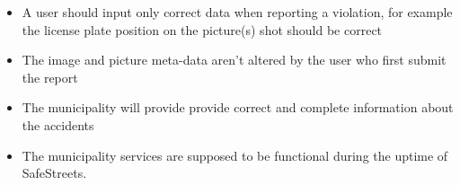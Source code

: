 \begin{itemize}

\item A user should input only correct data when reporting a violation, for example the license plate position on the picture(s) shot should be correct

\item The image and picture meta-data aren't altered by the user who first submit the report

\item The municipality will provide provide correct and complete information 
about the accidents

\item The municipality services are supposed to be functional during the uptime of SafeStreets.

\end{itemize}